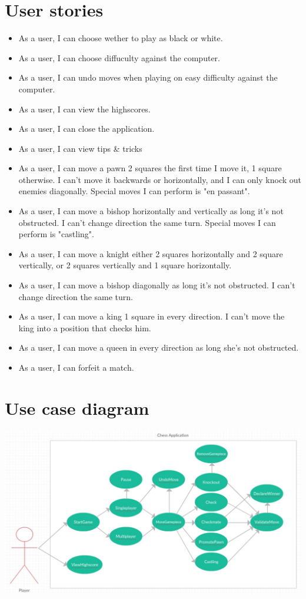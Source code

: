 \documentclass[letterpaper,11pt]{article}
\begin{document}
\newpage
\section*{User stories}
\begin{itemize}
	\item As a user, I can choose wether to play as black or white.
	\item As a user, I can choose diffuculty against the computer.
	\item As a user, I can undo moves when playing on easy difficulty against the computer.
	\item As a user, I can view the highscores.
	\item As a user, I can close the application.
	\item As a user, I can view tips \& tricks
	\item As a user, I can move a pawn 2 squares the first time I move it, 1 square otherwise. I can't move it backwards or horizontally, and I can only knock out enemies diagonally. Special moves I can perform is "en passant".
	\item As a user, I can move a bishop horizontally and vertically as long it's not obstructed. I can't change direction the same turn. Special moves I can perform is "castling".
	\item As a user, I can move a knight either 2 squares horizontally and 2 square vertically, or 2 squares vertically and 1 square horizontally.
	\item As a user, I can move a bishop diagonally as long it's not obstructed. I can't change direction the same turn.
	\item As a user, I can move a king 1 square in every direction. I can't move the king into a position that checks him.
	\item As a user, I can move a queen in every direction as long she's not obstructed.
	\item As a user, I can forfeit a match.
\end{itemize}

\newpage
\section*{Use case diagram}
\begin{center}
\includegraphics[width=16cm]{UseCaseDiagram}
\end{center}
\newpage
\end{document}
